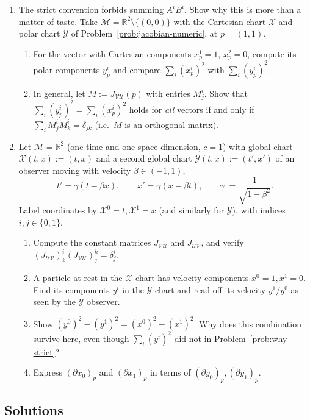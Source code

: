 \documentclass[11pt]{article}
\begin{document}
\begin{enumerate}[label=\textbf{4.\arabic*}, leftmargin=2.2cm, start=7]
\item \label{prob:why-strict}
The strict convention forbids summing $A^iB^i$. Show why this is
more than a matter of taste. Take $\mathcal M=\mathbb R^2\setminus\{(0,0)\}$
with the Cartesian chart $\mathcal X$ and polar chart $\mathcal Y$ of
Problem~\ref{prob:jacobian-numeric}, at $p=(1,1)$.
\begin{enumerate}[label=(\alph*)]
  \item For the vector with Cartesian components $x^1_p=1$, $x^2_p=0$,
  compute its polar components $y^i_p$ and compare $\sum_i(x^i_p)^2$ with
  $\sum_i(y^i_p)^2$.
  \item In general, let $M:=J_{\mathcal{VU}}(p)$ with entries $M^i_j$.
  Show that $\sum_i(y^i_p)^2=\sum_i(x^i_p)^2$ holds for \emph{all} vectors
  if and only if $\sum_iM^i_jM^i_k=\delta_{jk}$ (i.e.\ $M$ is an orthogonal
  matrix).
\end{enumerate}

\item \label{prob:boost}
Let $\mathcal M=\mathbb R^2$ (one time and one space dimension, $c=1$) with
global chart $\mathcal X(t,x):=(t,x)$ and a second global chart
$\mathcal Y(t,x):=(t',x')$ of an observer moving with velocity
$\beta\in(-1,1)$,
\[
t'=\gamma(t-\beta x),\qquad x'=\gamma(x-\beta t),\qquad
\gamma:=\frac{1}{\sqrt{1-\beta^2}}.
\]
Label coordinates by $\mathcal X^0=t,\mathcal X^1=x$ (and similarly for
$\mathcal Y$), with indices $i,j\in\{0,1\}$.
\begin{enumerate}[label=(\alph*)]
  \item Compute the constant matrices $J_{\mathcal{VU}}$ and
  $J_{\mathcal{UV}}$, and verify $(J_{\mathcal{UV}})^i_k(J_{\mathcal{VU}})^k_j=
  \delta^i_j$.
  \item A particle at rest in the $\mathcal X$ chart has velocity
  components $x^0=1,x^1=0$. Find its components $y^i$ in the $\mathcal Y$
  chart and read off its velocity $y^1/y^0$ as seen by the $\mathcal Y$
  observer.
  \item Show $(y^0)^2-(y^1)^2=(x^0)^2-(x^1)^2$. Why does this combination
  survive here, even though $\sum_i(y^i)^2$ did not in
  Problem~\ref{prob:why-strict}?
  \item Express $(\partial x_0)_p$ and $(\partial x_1)_p$ in terms of
  $(\partial y_0)_p,(\partial y_1)_p$.
\end{enumerate}

\end{enumerate}

\subsection*{Solutions}
\end{document}
